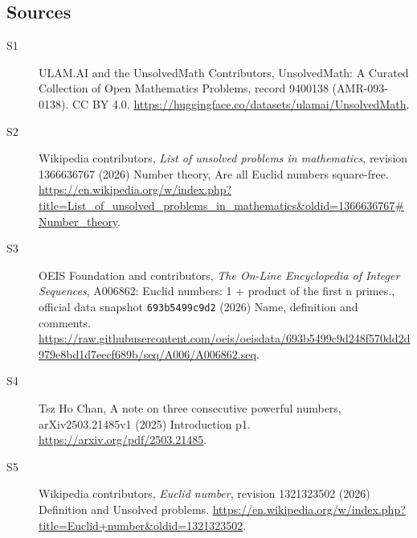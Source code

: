 \documentclass[11pt]{article}
\begin{document}
\subsection{Sources}
\begin{description}
\item[\hypertarget{source:9400138:1}{S1}] ULAM.AI and the UnsolvedMath Contributors, UnsolvedMath: A Curated Collection of Open Mathematics Problems, record 9400138 (AMR-093-0138). CC BY 4.0. \url{https://huggingface.co/datasets/ulamai/UnsolvedMath}.
\item[\hypertarget{source:9400138:2}{S2}] Wikipedia contributors, \emph{List of unsolved problems in mathematics}, revision 1366636767 (2026) Number theory, Are all Euclid numbers square-free. \url{https://en.wikipedia.org/w/index.php?title=List_of_unsolved_problems_in_mathematics&oldid=1366636767#Number_theory}.
\item[\hypertarget{source:9400138:3}{S3}] OEIS Foundation and contributors, \emph{The On-Line Encyclopedia of Integer Sequences}, A006862: Euclid numbers: 1 + product of the first n primes., official data snapshot \texttt{693b5499c9d2} (2026) Name, definition and comments. \url{https://raw.githubusercontent.com/oeis/oeisdata/693b5499c9d248f570dd2d979e8bd1d7eecf689b/seq/A006/A006862.seq}.
\item[\hypertarget{source:9400138:4}{S4}] Tsz Ho Chan, A note on three consecutive powerful numbers, arXiv2503.21485v1 (2025) Introduction p1. \url{https://arxiv.org/pdf/2503.21485}.
\item[\hypertarget{source:9400138:5}{S5}] Wikipedia contributors, \emph{Euclid number}, revision 1321323502 (2026) Definition and Unsolved problems. \url{https://en.wikipedia.org/w/index.php?title=Euclid+number&oldid=1321323502}.
\end{description}
\label{end:9400138}
\end{document}
